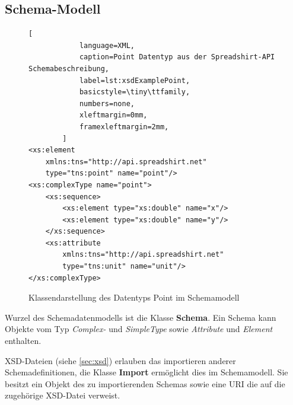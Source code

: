 \subsection{Schema-Modell}
\label{sec:schema_model}

\begin{figure}[ht]
    \centering
    \begin{minipage}[b]{0.50\linewidth}
        \begin{lstlisting}[
            language=XML,
            caption=Point Datentyp aus der Spreadshirt-API Schemabeschreibung,
            label=lst:xsdExamplePoint,    
            basicstyle=\tiny\ttfamily,
            numbers=none,
            xleftmargin=0mm,
            framexleftmargin=2mm,
        ]
<xs:element 
    xmlns:tns="http://api.spreadshirt.net" 
    type="tns:point" name="point"/>
<xs:complexType name="point">
    <xs:sequence>
        <xs:element type="xs:double" name="x"/>
        <xs:element type="xs:double" name="y"/>
    </xs:sequence>
    <xs:attribute 
        xmlns:tns="http://api.spreadshirt.net" 
        type="tns:unit" name="unit"/>
</xs:complexType>
        \end{lstlisting}
    \end{minipage}
    \quad    
    \begin{minipage}[b]{0.45\linewidth}
        \caption{Klassendarstellung des Datentyps Point im Schemamodell}
    \end{minipage}
\end{figure}

Wurzel des Schemadatenmodells ist die Klasse \textbf{Schema}. Ein Schema kann Objekte vom Typ \emph{Complex-} und \emph{SimpleType} sowie \emph{Attribute} und \emph{Element} enthalten.

XSD-Dateien (siehe \cref{sec:xsd}) erlauben das importieren anderer Schemadefinitionen, die Klasse \textbf{Import} ermöglicht dies im Schemamodell. Sie besitzt ein Objekt des zu importierenden Schemas sowie eine URI die auf die zugehörige XSD-Datei verweist.

